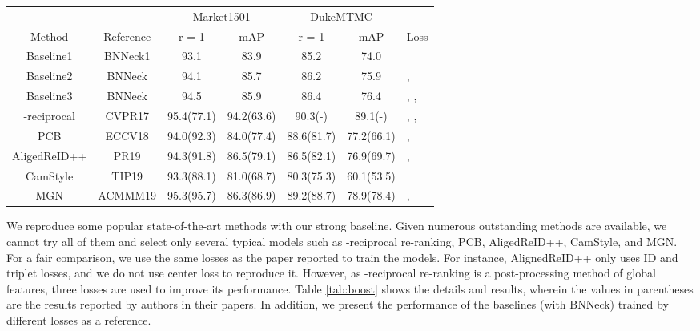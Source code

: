 \documentclass[journal]{IEEEtran}
\begin{document}
\renewcommand{\multirowsetup}{\centering}
\begin{table*}[tb]\footnotesize
  \begin{center}
  \begin{tabular}{ c|c|cc|cc|l}
\hline
    		&		       & \multicolumn{2}{c|}{Market1501} & \multicolumn{2}{c|}{DukeMTMC} &  	 \\
  Method    & Reference	   & r = 1 	& mAP	&r = 1 	& mAP &\multicolumn{1}{c}{Loss} 	 \\
 	\hline
	\hline
    Baseline1   &   BNNeck1 &93.1     &83.9	    &85.2        &74.0  & \\
    Baseline2   &   BNNeck  &94.1     &85.7	    &86.2        &75.9  & ,          \\
    Baseline3   &   BNNeck  &94.5	  &85.9	    &86.4	&76.4	  & , ,  \\
    \hline
    -reciprocal\cite{xiong2019good}  & CVPR17	        &95.4(77.1)     &94.2(63.6)	    &90.3(-)        &89.1(-)  & , ,   \\
    PCB\cite{sun2018beyond}             & ECCV18            & 94.0(92.3)	& 84.0(77.4)	& 88.6(81.7)	& 77.2(66.1)  & , 		\\
    AligedReID++ \cite{LUO2019}     & PR19                  & 94.3(91.8)	& 86.5(79.1)	& 86.5(82.1)	&76.9(69.7)    & ,         \\
    CamStyle\cite{zhong2019camstyle}  & TIP19               & 93.3(88.1)	& 81.0(68.7)	& 80.3(75.3)	& 60.1(53.5)	 & 	\\
    MGN\cite{wang2018learning}     & ACMMM19                & 95.3(95.7)	&86.3(86.9)	&89.2(88.7) &78.9(78.4)		 & , \\
\hline

  \end{tabular}
  \end{center}
  \caption{\label{tab:boost} Performance of some state-of-the-art methods reproduced by our strong baseline. The values in parentheses are the results reported by authors.}
\vspace{-2mm}
\end{table*}
We reproduce some popular state-of-the-art methods with our strong baseline. Given numerous outstanding methods are available, we cannot try all of them and select only several typical models such as -reciprocal re-ranking\cite{zhong2017re}, PCB\cite{sun2018beyond}, AligedReID++\cite{LUO2019}, CamStyle\cite{zhong2019camstyle}, and MGN\cite{wang2018learning}.
For a fair comparison, we use the same losses as the paper reported to train the models. 
For instance, AlignedReID++ only uses ID and triplet losses, and we do not use center loss to reproduce it. 
However, as -reciprocal re-ranking is a post-processing method of global features, three losses are used to improve its performance. Table \ref{tab:boost} shows the details and results, wherein the values in parentheses are the results reported by authors in their papers. In addition, we present the performance of the baselines (with BNNeck) trained by different losses as a reference.
\end{document}

